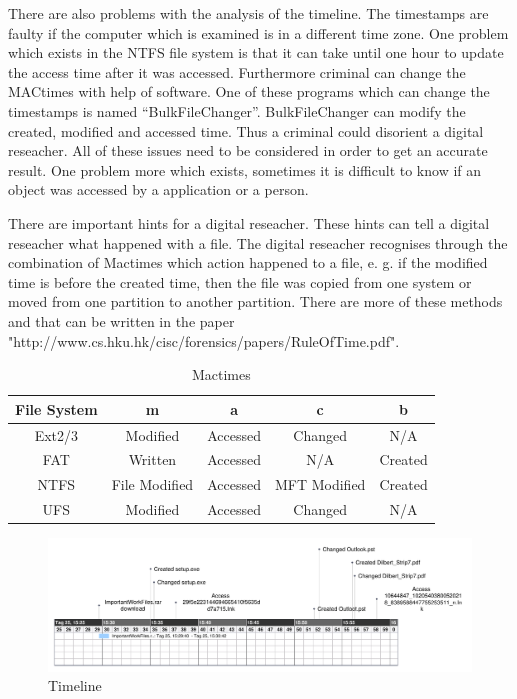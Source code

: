 There are also problems with the analysis of the timeline. The timestamps are faulty if the computer which is examined is in a different time zone. One problem which exists in the NTFS file system is that it can take until one hour to update the access time after it was accessed. Furthermore criminal can change the MACtimes with help of software. One of these programs which can change the timestamps is named “BulkFileChanger”. BulkFileChanger can modify the created, modified and accessed time. Thus a criminal could disorient a digital reseacher. All of these issues need to be considered in order to get an accurate result. One problem more which exists, sometimes it is difficult to know if an object was accessed by a application or a person. 

There are important hints for a digital reseacher. These hints can tell a digital reseacher what happened with a file. The digital reseacher recognises through the combination of Mactimes which action happened to a file, e. g. if the modified time is before the created time, then the file was copied from one system or moved from one partition to another partition. There are more of these methods and that can be written in the paper "http://www.cs.hku.hk/cisc/forensics/papers/RuleOfTime.pdf".






\begin{table}[h]
\begin{tabular}{c|c|c|c|c}
	File System & m & a & c & b \\
	\hline \hline
	Ext2/3 & Modified & Accessed & Changed & N/A \\
	\hline
	FAT & Written & Accessed & N/A & Created \\
	\hline
	NTFS & File Modified & Accessed & MFT Modified & Created \\
	\hline
	UFS & Modified & Accessed & Changed & N/A \\

\end{tabular}
\caption{Mactimes}
\label{fig:Mactimes}
\end{table}



\begin{figure}[H]
	\centering

		\includegraphics[width=18cm]{graphics/Timeline.pdf} 	
	\caption{Timeline}
	\label{fig:timeline}
\end{figure}





